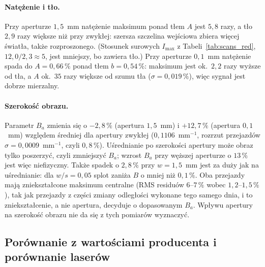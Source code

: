 \documentclass[12pt, a4paper]{article}
\begin{document}
\paragraph{Natężenie i tło.} Przy aperturze $1{,}5$~mm natężenie maksimum ponad tłem $A$ jest $5{,}8$ razy, a tło $2{,}9$ razy
większe niż przy zwykłej: szersza szczelina wejściowa zbiera więcej światła, także
rozproszonego. (Stosunek surowych $I_\text{max}$ z Tabeli~\ref{tab:scans_red}, $12{,}0/2{,}3 \approx 5$,
jest mniejszy, bo zawiera tło.) Przy aperturze $0{,}1$~mm natężenie spada do $A = 0{,}66\,\%$
ponad tłem $b = 0{,}54\,\%$: maksimum jest ok.\ $2{,}2$ razy wyższe od tła, a $A$ ok.\ $35$ razy
większe od szumu tła ($\sigma = 0{,}019\,\%$), więc sygnał jest dobrze mierzalny.

\paragraph{Szerokość obrazu.} Parametr $B_a$ zmienia się o $-2{,}8\,\%$ (apertura $1{,}5$~mm) i $+12{,}7\,\%$ (apertura $0{,}1$~mm)
względem średniej dla apertury zwykłej ($0{,}1106$~mm$^{-1}$, rozrzut przejazdów
$\sigma = 0{,}0009$~mm$^{-1}$, czyli $0{,}8\,\%$). Uśrednianie po szerokości apertury może obraz
tylko poszerzyć, czyli zmniejszyć $B_a$; wzrost $B_a$ przy węższej aperturze o $13\,\%$ jest więc
niefizyczny. Także spadek o $2{,}8\,\%$ przy $w = 1{,}5$~mm jest za duży jak na uśrednianie:
dla $w/s = 0{,}05$ splot zaniża $B$ o mniej niż $0{,}1\,\%$. Oba przejazdy mają zniekształcone maksimum centralne (RMS residuów $6$--$7\,\%$
wobec $1{,}2$--$1{,}5\,\%$), tak jak przejazdy z części zmiany odległości wykonane tego samego dnia,
i to zniekształcenie, a nie apertura, decyduje o dopasowanym $B_a$. Wpływu apertury na
szerokość obrazu nie da się z tych pomiarów wyznaczyć.

\subsection{Porównanie z wartościami producenta i porównanie laserów}
\label{sec:scale}
\end{document}
